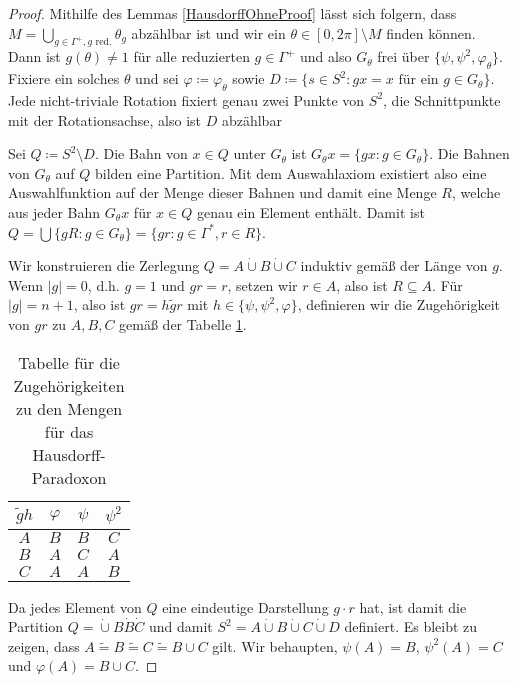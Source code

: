 \documentclass[german]{article}
\theoremstyle{break}
\theoremstyle{def_style}
\theoremstyle{def_style}
\theoremstyle{lemma_style}
\begin{document}
\begin{proof}
	Mithilfe des Lemmas \ref{HausdorffOhneProof} lässt sich folgern, dass $M=\bigcup\limits_{g\in\Gamma^+, g\text{ red.}}\theta_g$ abzählbar ist und wir ein $\theta\in [0,2\pi]\setminus M$ finden können. Dann ist $g(\theta)\neq 1$ für alle reduzierten $g\in\Gamma^+$ und also $G_\theta$ frei über $\{\psi,\psi^2,\varphi_\theta\}$. Fixiere ein solches $\theta$ und sei $\varphi\coloneqq\varphi_\theta$ sowie $D\coloneqq\{s\in S^2 : gx=x\text{ für ein } g\in G_\theta\}$. Jede nicht-triviale Rotation fixiert genau zwei Punkte von $S^2$, die Schnittpunkte mit der Rotationsachse, also ist $D$ abzählbar
	
	Sei $Q\coloneqq S^2\setminus D$. Die Bahn von $x\in Q$ unter $G_\theta$ ist $G_\theta x=\{gx : g\in G_\theta\}$. Die Bahnen von $G_\theta$ auf $Q$ bilden eine Partition. Mit dem Auswahlaxiom existiert also eine Auswahlfunktion auf der Menge dieser Bahnen und damit eine Menge $R$, welche aus jeder Bahn $G_\theta x$ für $x\in Q$ genau ein Element enthält. Damit ist $Q=\bigcup\{gR : g\in G_\theta\}=\{gr : g\in\Gamma^\ast,r\in R\}$.
	
	Wir konstruieren die Zerlegung $Q=A\dot{\cup} B \dot{\cup}C$ induktiv gemäß der Länge von $g$. Wenn $\vert g \vert=0$, d.h. $g=1$ und $gr=r$, setzen wir $r\in A$, also ist $R\subseteq A$. Für $\vert g \vert = n+1$, also ist $gr=h\tilde{g}r$ mit $h\in\{\psi,\psi^2,\varphi\}$, definieren wir die Zugehörigkeit von $gr$ zu $A,B,C$ gemäß der Tabelle \ref{HausdorffTabelle}.
	\begin{table}[h]
		\begin{center}
			\begin{tabular}{c|ccc}
				$\tilde{g}h$ & $\varphi$ & $\psi$ & $\psi^2$ \\
				\hline
				$A$ & $B$ & $B$ & $C$ \\
				$B$ & $A$ & $C$ & $A$ \\
				$C$ & $A$ & $A$ & $B$ \\
			\end{tabular}
		\end{center}
		\caption{Tabelle für die Zugehörigkeiten zu den Mengen für das Hausdorff-Paradoxon}
		\label{HausdorffTabelle}
	\end{table}

	Da jedes Element von $Q$ eine eindeutige Darstellung $g\cdot r$ hat, ist damit die Partition $Q=\dot{\cup}B\dot{B}\dot{C}$ und damit $S^2=A\dot{\cup}B\dot{\cup}C\dot{\cup}D$ definiert. Es bleibt zu zeigen, dass $A\widetilde{=}B\widetilde{=}C\widetilde{=}B\cup C$ gilt. Wir behaupten, $\psi(A)=B$, $\psi^2(A)=C$ und $\varphi(A)=B\cup C$.
	\par
	

\end{proof}
\end{document}
